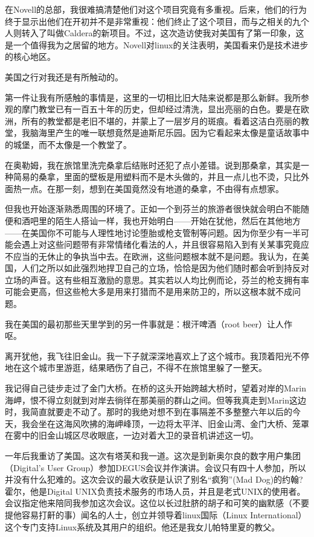 在Novell的总部，我很难搞清楚他们对这个项目究竟有多重视。后来，他们的行为终于显示出他们在开初并不是非常重视：他们终止了这个项目，而与之相关的九个人则转入了叫做Caldera的新项目。不过，这次造访使我对美国有了第一印象，这是一个值得我为之居留的地方。Novell对linux的关注表明，美国看来仍是技术进步的核心地区。

美国之行对我还是有所触动的。

第一件让我有所感触的事情是，这里的一切相比旧大陆来说都是那么新鲜。我所参观的摩门教堂已有一百五十年的历史，但却经过清洗，显出亮丽的白色。要是在欧洲，所有的教堂都是老旧不堪的，并蒙上了一层岁月的斑痕。看着这洁白亮丽的教堂，我脑海里产生的唯一联想竟然是迪斯尼乐园。因为它看起来太像是童话故事中的城堡，而不太像是一个教堂了。

在奥勒姆，我在旅馆里洗完桑拿后结账时还犯了点小差错。说到那桑拿，其实是一种简易的桑拿，里面的壁板是用塑料而不是木头做的，并且一点儿也不烫，只比外面热一点。在那一刻，想到在美国竟然没有地道的桑拿，不由得有点想家。

但我也开始逐渐熟悉周围的环境了。正如一个到芬兰的旅游者很快就会明白不能随便和酒吧里的陌生人搭讪一样，我也开始明白——开始在犹他，然后在其他地方——在美国你不可能与人理性地讨论堕胎或枪支管制等问题。因为你至少有一半可能会遇上对这些问题带有非常情绪化看法的人，并且很容易陷入到有关某事究竟应不应当的无休止的争执当中去。在欧洲，这些问题根本就不是问题。我认为，在美国，人们之所以如此强烈地捍卫自己的立场，恰恰是因为他们随时都会听到持反对立场的声音。这有些相互激励的意思。其实若以人均比例而论，芬兰的枪支拥有率可能会更高，但这些枪大多是用来打猎而不是用来防卫的，所以这根本就不成问题。

我在美国的最初那些天里学到的另一件事就是：根汗啤酒（root beer）让人作呕。

离开犹他，我飞往旧金山。我一下子就深深地喜欢上了这个城市。我顶着阳光不停地在这个城市里游逛，结果晒伤了自己，不得不在旅馆里躲了一整天。

我记得自己徒步走过了金门大桥。在桥的这头开始跨越大桥时，望着对岸的Marin海岬，恨不得立刻就到对岸去徜徉在那美丽的群山之间。但等我真走到Marin这边时，我简直就要走不动了。那时的我绝对想不到在事隔差不多整整六年以后的今天，我会坐在这海风吹拂的海岬峰顶，一边将太平洋、旧金山湾、金门大桥、笼罩在雾中的旧金山城区尽收眼底，一边对着大卫的录音机讲述这一切。

一年后我重访了美国。这次有塔芙和我一道。这次是到新奥尔良的数字用户集团（Digital’s User Group）参加DEGUS会议并作演讲。会议只有四十人参加，所以并没有什么犯难的。这次会议的最大收获是认识了别名“疯狗”(Mad Dog)的约翰?霍尔，他是Digital UNIX负责技术服务的市场人员，并且是老式UNIX的使用者。会议指定他来陪同我参加这次会议。这位以长过肚脐的胡子和可笑的幽默感（不要提他容易打鼾的事）闻名的人士，创立并领导着linux国际（Linux International）这个专门支持Linux系统及其用户的组织。他还是我女儿帕特里夏的教父。

